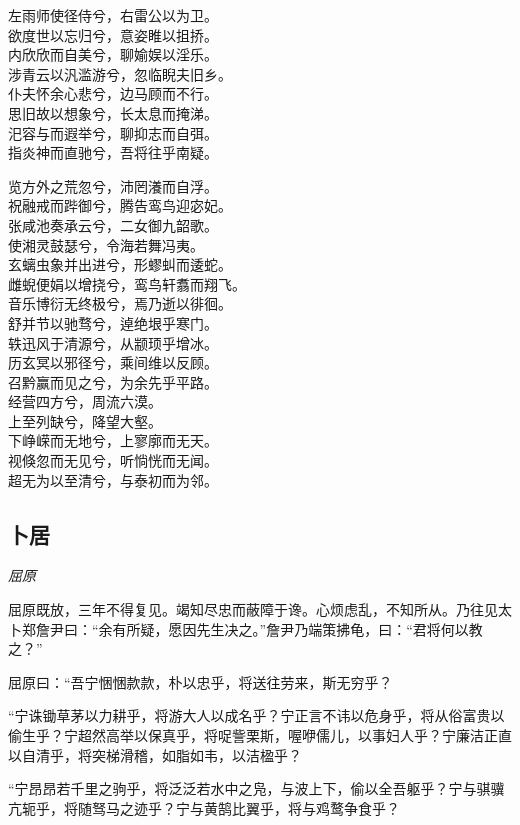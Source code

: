 \documentclass[]{article}
\begin{document}
左雨师使径侍兮，右雷公以为卫。\\
欲度世以忘归兮，意姿睢以抯挢。\\
内欣欣而自美兮，聊媮娱以淫乐。\\
涉青云以汎滥游兮，忽临睨夫旧乡。\\
仆夫怀余心悲兮，边马顾而不行。\\
思旧故以想象兮，长太息而掩涕。\\
汜容与而遐举兮，聊抑志而自弭。\\
指炎神而直驰兮，吾将往乎南疑。

览方外之荒忽兮，沛罔瀁而自浮。\\
祝融戒而跸御兮，腾告鸾鸟迎宓妃。\\
张咸池奏承云兮，二女御九韶歌。\\
使湘灵鼓瑟兮，令海若舞冯夷。\\
玄螭虫象并出进兮，形蟉虯而逶蛇。\\
雌蜺便娟以增挠兮，鸾鸟轩翥而翔飞。\\
音乐博衍无终极兮，焉乃逝以徘徊。\\
舒并节以驰骛兮，逴绝垠乎寒门。\\
轶迅风于清源兮，从颛顼乎增冰。\\
历玄冥以邪径兮，乘间维以反顾。\\
召黔赢而见之兮，为余先乎平路。\\
经营四方兮，周流六漠。\\
上至列缺兮，降望大壑。\\
下峥嵘而无地兮，上寥廓而无天。\\
视倏忽而无见兮，听惝恍而无闻。\\
超无为以至清兮，与泰初而为邻。

\hypertarget{header-n137}{%
\subsection{卜居}\label{header-n137}}

\emph{屈原}

屈原既放，三年不得复见。竭知尽忠而蔽障于谗。心烦虑乱，不知所从。乃往见太卜郑詹尹曰：``余有所疑，愿因先生决之。''詹尹乃端策拂龟，曰：``君将何以教之？''

屈原曰：``吾宁悃悃款款，朴以忠乎，将送往劳来，斯无穷乎？

``宁诛锄草茅以力耕乎，将游大人以成名乎？宁正言不讳以危身乎，将从俗富贵以偷生乎？宁超然高举以保真乎，将哫訾栗斯，喔咿儒儿，以事妇人乎？宁廉洁正直以自清乎，将突梯滑稽，如脂如韦，以洁楹乎？

``宁昂昂若千里之驹乎，将泛泛若水中之凫，与波上下，偷以全吾躯乎？宁与骐骥亢轭乎，将随驽马之迹乎？宁与黄鹄比翼乎，将与鸡鹜争食乎？
\end{document}
